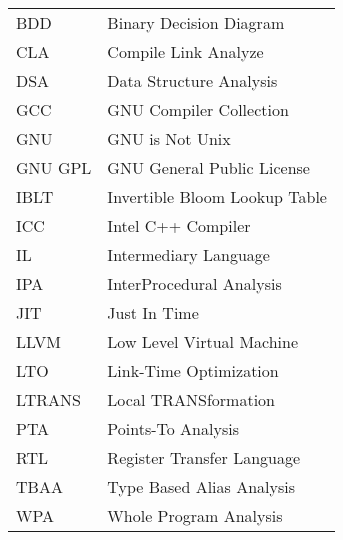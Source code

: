 \begin{tabular}{ll}
BDD		& Binary Decision Diagram\\
CLA		& Compile Link Analyze\\
DSA		& Data Structure Analysis \\
GCC		& GNU Compiler Collection \\
GNU		& GNU is Not Unix\\
GNU GPL	& GNU General Public License \\
IBLT	& Invertible Bloom Lookup Table\\
ICC		& Intel C++ Compiler\\
IL		& Intermediary Language\\
IPA		& InterProcedural Analysis\\
JIT		& Just In Time\\
LLVM	& Low Level Virtual Machine\\
LTO		& Link-Time Optimization\\
LTRANS	& Local TRANSformation \\
PTA		& Points-To Analysis \\
RTL		& Register Transfer Language \\
TBAA	& Type Based Alias Analysis \\
WPA		& Whole Program Analysis \\
\end{tabular}
